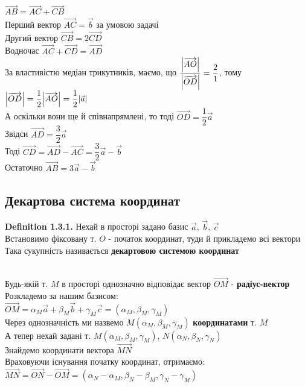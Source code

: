 \documentclass[a4paper, 14pt]{extarticle}
\def\defin#1{\textbf{Definition {#1}}}
\def\bigline{\vspace{5mm}\\}
\begin{document}
	$\overrightarrow{AB} = \overrightarrow{AC} + \overrightarrow{CB}$\\
	Перший вектор $\overrightarrow{AC} = \vec{b}$ за умовою задачі\\
	Другий вектор $\overrightarrow{CB} = 2 \overrightarrow{CD}$\\
	Водночас $\overrightarrow{AC} + \overrightarrow{CD} = \overrightarrow{AD}$\\
	За властивістю медіан трикутників, маємо, що $\dfrac{\abs{\overrightarrow{AO}}}{\abs{\overrightarrow{OD}}} = \dfrac{2}{1}$, тому \\ $\abs{\overrightarrow{OD}} = \dfrac{1}{2} \abs{\overrightarrow{AO}} = \dfrac{1}{2} \abs{\vec{a}}$\\
	А оскільки вони ще й співнапрямлені, то тоді $\overrightarrow{OD} = \dfrac{1}{2} \vec{a}$\\
	Звідси $\overrightarrow{AD} = \dfrac{3}{2} \vec{a}$\\
	Тоді $\overrightarrow{CD} = \overrightarrow{AD} - \overrightarrow{AC} = \dfrac{3}{2} \vec{a} - \vec{b}$\\
	Остаточно $\overrightarrow{AB} = 3 \vec{a} - \vec{b}$
	
	\subsection{Декартова система координат}
	\defin{1.3.1.} Нехай в просторі задано базис $\vec{a}$, $\vec{b}$, $\vec{c}$\\
	Встановимо фіксовану т. $O$ - початок координат, туди й прикладемо всі вектори\\
	Така сукупність називається \textbf{декартовою системою координат}\\
	\bigline
	Будь-якій т. $M$ в просторі однозначно відповідає вектор $\overrightarrow{OM}$ - \textbf{радіус-вектор}\\
	Розкладемо за нашим базисом:\\
	$\overrightarrow{OM} = \alpha_M \vec{a} + \beta_M \vec{b} + \gamma_M \vec{c} = (\alpha_M, \beta_M, \gamma_M)$\\
	Через однозначність ми назвемо $M(\alpha_M, \beta_M, \gamma_M)$ \textbf{координатами} т. $M$
	\bigline
	А тепер нехай задані т. $M(\alpha_M, \beta_M, \gamma_M)$, $N(\alpha_N, \beta_N, \gamma_N)$\\
	Знайдемо координати вектора $\overrightarrow{MN}$\\
	Враховуючи існування початку координат, отримаємо:\\
	$\overrightarrow{MN} = \overrightarrow{ON} - \overrightarrow{OM} = (\alpha_N - \alpha_M, \beta_N - \beta_M, \gamma_N - \gamma_M)$
	
\end{document}
